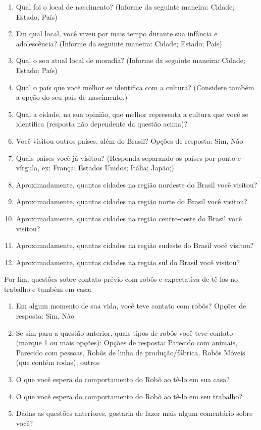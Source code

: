\begin{enumerate}
	\item Qual foi o local de nascimento? (Informe da seguinte maneira: Cidade; Estado; País)
	\item Em qual local, você viveu por mais tempo durante sua infância e adolescência? (Informe da seguinte maneira: Cidade; Estado; País)
	\item Qual o seu atual local de moradia? (Informe da seguinte maneira: Cidade; Estado; País)
	\item Qual o país que você melhor se identifica com a cultura? (Considere também a opção do seu país de nascimento.)
	\item Qual a cidade, na sua opinião, que melhor representa a cultura que você se identifica (resposta não dependente da questão acima)?
	\item Você visitou outros países, além do Brasil? Opções de resposta: Sim, Não
	\item Quais países você já visitou? (Responda separando os países por ponto e vírgula, ex: França; Estados Unidos; Itália; Japão;)
	\item Aproximadamente, quantas cidades na região nordeste do Brasil você visitou?
	\item Aproximadamente, quantas cidades na região norte do Brasil você visitou?
	\item Aproximadamente, quantas cidades na região centro-oeste do Brasil você visitou?
	\item Aproximadamente, quantas cidades na região sudeste do Brasil você visitou?
	\item Aproximadamente, quantas cidades na região sul do Brasil você visitou?
\end{enumerate}

Por fim, questões sobre contato prévio com robôs e expectativa de tê-los no trabalho e também em casa:

\begin{enumerate}
	\item Em algum momento de sua vida, você teve contato com robôs? Opções de resposta: Sim, Não
	\item Se sim para a questão anterior, quais tipos de robôs você teve contato (marque 1 ou mais opções): Opções de resposta: Parecido com animais, Parecido com pessoas, Robôs de linha de produção/fábrica, Robôs Móveis (que contém rodas), outros
	\item O que você espera do comportamento do Robô ao tê-lo em sua casa?
	\item O que você espera do comportamento do Robô ao tê-lo em seu trabalho?
	\item Dadas as questões anteriores, gostaria de fazer mais algum comentário sobre você?
\end{enumerate}

